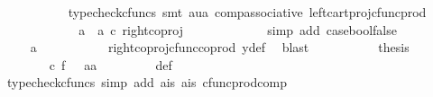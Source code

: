 \begin{isabellebody}
\ \ \ \ \ \ \ \ \ \isamarkupfalse%
\ {\isacharparenleft}{\kern0pt}typecheck{\isacharunderscore}{\kern0pt}cfuncs{\isacharcomma}{\kern0pt}\ smt\ aua\ comp{\isacharunderscore}{\kern0pt}associative{}\ left{\isacharunderscore}{\kern0pt}cart{\isacharunderscore}{\kern0pt}proj{\isacharunderscore}{\kern0pt}cfunc{\isacharunderscore}{\kern0pt}prod{\isacharparenright}{\kern0pt}\isanewline
\ \ \ \ \ \ \ \isamarkupfalse%
\ \isamarkupfalse%
\ {\isachardoublequoteopen}{\isachardot}{\kern0pt}{\isachardot}{\kern0pt}{\isachardot}{\kern0pt}\ {\isacharequal}{\kern0pt}\ {\isacharparenleft}{\kern0pt}a{}\ {\isasymamalg}\ a{}{\isacharparenright}{\kern0pt}\ {\isasymcirc}\isactrlsub c\ right{\isacharunderscore}{\kern0pt}coproj\ {\isasymone}\ {\isasymone}{\isachardoublequoteclose}\isanewline
\ \ \ \ \ \ \ \ \ \isamarkupfalse%
\ {\isacharparenleft}{\kern0pt}simp\ add{\isacharcolon}{\kern0pt}\ case{\isacharunderscore}{\kern0pt}bool{\isacharunderscore}{\kern0pt}false{\isacharparenright}{\kern0pt}\isanewline
\ \ \ \ \ \ \ \isamarkupfalse%
\ \isamarkupfalse%
\ {\isachardoublequoteopen}{\isachardot}{\kern0pt}{\isachardot}{\kern0pt}{\isachardot}{\kern0pt}\ {\isacharequal}{\kern0pt}\ a{}{\isachardoublequoteclose}\isanewline
\ \ \ \ \ \ \ \ \ \isamarkupfalse%
\ right{\isacharunderscore}{\kern0pt}coproj{\isacharunderscore}{\kern0pt}cfunc{\isacharunderscore}{\kern0pt}coprod\ y{\isacharunderscore}{\kern0pt}def\ \isamarkupfalse%
\ blast\isanewline
\ \ \ \ \ \ \ \isamarkupfalse%
\ \isamarkupfalse%
\ {\isacharquery}{\kern0pt}thesis\isacommand{{\isachardot}{\kern0pt}}\isamarkupfalse%
\isanewline
\ \ \ \ \ \isamarkupfalse%
\isanewline
\ \ \ \ \ \isamarkupfalse%
\ {\isachardoublequoteopen}{\isasymphi}\ {\isasymcirc}\isactrlsub c\ f\ \ {\isacharequal}{\kern0pt}\ {\isasymlangle}a{}{\isacharcomma}{\kern0pt}a{}{\isasymrangle}{\isachardoublequoteclose}\isanewline
\ \ \ \ \ \ \ \isamarkupfalse%
\ {\isasymphi}{\isacharunderscore}{\kern0pt}def\ \isamarkupfalse%
\ {\isacharparenleft}{\kern0pt}typecheck{\isacharunderscore}{\kern0pt}cfuncs{\isacharcomma}{\kern0pt}\ simp\ add{\isacharcolon}{\kern0pt}\ a{}{\isacharunderscore}{\kern0pt}is\ a{}{\isacharunderscore}{\kern0pt}is\ cfunc{\isacharunderscore}{\kern0pt}prod{\isacharunderscore}{\kern0pt}comp{\isacharparenright}{\kern0pt}\isanewline

\end{isabellebody}
